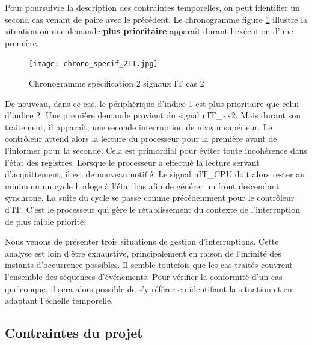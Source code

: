Pour poursuivre la description des contraintes temporelles, on peut identifier un second cas venant de paire avec le précédent.
Le chronogramme figure \ref{fig:spe_2IT} illustre la situation où une demande \textbf{plus prioritaire} apparaît durant l'exécution d'une première.
\begin{figure}[H]
	\centering
	\texttt{[image: chrono\_specif\_2IT.jpg]}
	\caption{Chronogramme spécification 2 signaux IT cas 2}
	\label{fig:spe_2IT}
\end{figure}
De nouveau, dans ce cas, le périphérique d'indice 1 est plus prioritaire que celui d'indice 2. 
Une première demande provient du signal nIT\_xx2.
Mais durant son traitement, il apparaît, une seconde interruption de niveau supérieur.
Le contrôleur attend alors la lecture du processeur pour la première avant de l'informer pour la seconde.
Cela est primordial pour éviter toute incohérence dans l'état des registres.
Lorsque le processeur a effectué la lecture servant d'acquittement, il est de nouveau notifié.
Le signal nIT\_CPU doit alors rester au minimum un cycle horloge à l'état bas afin de générer un front descendant synchrone.
La suite du cycle se passe comme précédemment pour le contrôleur d'IT.
C'est le processeur qui gère le rétablissement du contexte de l'interruption de plus faible priorité.

\gap
Nous venons de présenter trois situations de gestion d'interruptions. 
Cette analyse est loin d'être exhaustive, principalement en raison de l'infinité des instants d'occurrence possibles.
Il semble toutefois que les cas traités couvrent l'ensemble des séquences d'événements.
Pour vérifier la conformité d'un cas quelconque, il sera alors possible de s'y référer en identifiant la situation et en adaptant l'échelle temporelle.

\subsection{Contraintes du projet}

